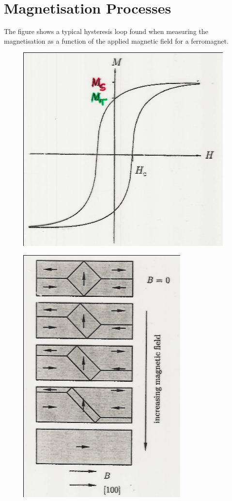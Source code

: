 \documentclass[a4paper, 11pt, normalem]{report}
\begin{document}
\section{Magnetisation Processes}
The figure shows a typical hysteresis loop found when measuring the magnetisation as a function of the applied magnetic field for a ferromagnet.
\begin{figure}[H]
    \centering
    \includegraphics[scale=0.5]{process.png}
\end{figure}
\begin{figure}
    \centering
    \includegraphics[scale=0.4]{incmag.png}
\end{figure}
\end{document}
